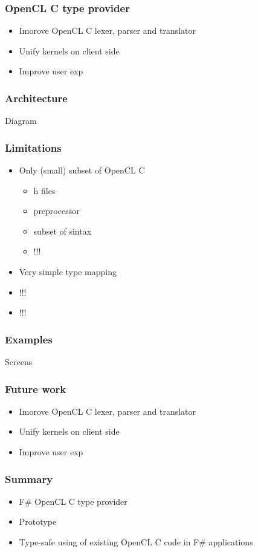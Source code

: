 \documentclass[xcolor=table]{beamer}
\begin{document}
\begin{frame}
  \transwipe[direction=90]
  \frametitle{OpenCL C type provider}
\begin{itemize}
\item Imorove OpenCL C lexer, parser and  translator
\item Unify kernels on client side
\item Improve user exp
\end{itemize}

\end{frame}
            
\begin{frame}
  \transwipe[direction=90]
  \frametitle{Architecture}
  Diagram
\end{frame}

\begin{frame}
  \transwipe[direction=90]
  \frametitle{Limitations }
\begin{itemize}
\item Only (small) subset of OpenCL C
 \begin{itemize}
 \item h files
 \item preprocessor
 \item subset of sintax
 \item !!!
 \end{itemize}
\item Very simple type mapping
\item !!!
\item !!!
\end{itemize}

\end{frame}

            
\begin{frame}
  \transwipe[direction=90]
  \frametitle{Examples}         
  Screens
\end{frame}     

\begin{frame}
  \transwipe[direction=90]
  \frametitle{Future work}         
\begin{itemize}
\item Imorove OpenCL C lexer, parser and  translator
\item Unify kernels on client side
\item Improve user exp
\end{itemize}
\end{frame}     
            
            
\begin{frame}
  \transwipe[direction=90]
  \frametitle{Summary}         
\begin{itemize}
\item F\# OpenCL C type provider
\item Prototype
\item Type-safe using of existing OpenCL C code in F\# applications
\end{itemize}
\end{frame}           
            
\end{document}
